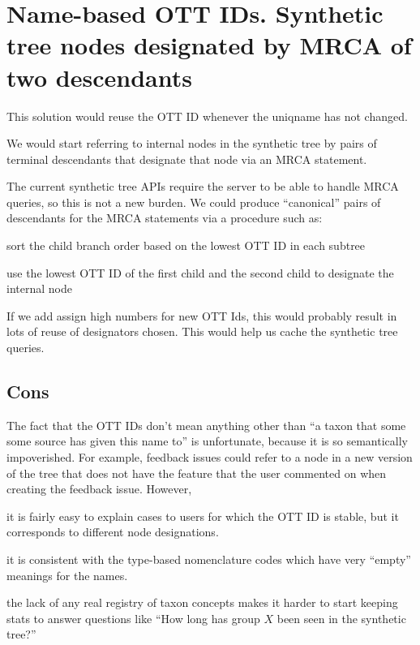 \documentclass[11pt]{article}
\begin{document}
\section{Name-based OTT IDs. Synthetic tree nodes designated by MRCA of two descendants}
This solution would reuse the OTT ID whenever the uniqname has not changed.

We would start referring to internal nodes in the synthetic tree by pairs of
  terminal descendants that designate that node via an MRCA statement.

The current synthetic tree APIs require the server to be able to handle MRCA
  queries, so this is not a new burden.
We could produce ``canonical'' pairs of descendants for the MRCA statements
  via a procedure such as:
\begin{compactenum}
  \item sort the child branch order based on the lowest OTT ID in each subtree
  \item use the lowest OTT ID of the first child and the second child to designate the internal node
\end{compactenum}
If we add assign high numbers for new OTT Ids, this would probably result in
  lots of reuse of designators chosen.
This would help us cache the synthetic tree queries.

\subsection{Cons}
\begin{compactenum}
  \item The fact that the OTT IDs don't mean anything other than ``a taxon that some
  some source has given this name to'' is unfortunate, because it is so 
  semantically impoverished.
  For example, feedback issues could refer to a node in a new version of the
  tree that does not have the feature that the user commented on when creating
  the feedback issue.
  However,
  \begin{compactenum}
    \item it is fairly easy to explain cases to users for which the OTT ID is stable,
    but it corresponds to different node designations.
    \item it is consistent with the type-based nomenclature codes which have
    very ``empty'' meanings for the names.
  \end{compactenum}
  \item the lack of any real registry of taxon concepts makes it harder to
  start keeping stats to answer questions like ``How long has group $X$ been
  seen in the synthetic tree?''
\end{compactenum}
\end{document}
